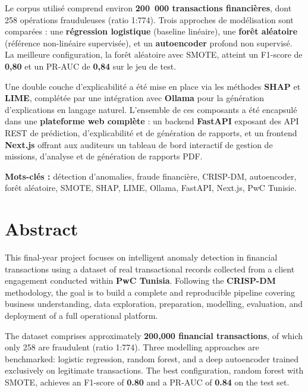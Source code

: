 \documentclass[12pt,a4paper,twoside]{report}
\begin{document}
Le corpus utilisé comprend environ \textbf{200~000 transactions financières}, dont 258 opérations frauduleuses (ratio 1:774). Trois approches de modélisation sont comparées : une \textbf{régression logistique} (baseline linéaire), une \textbf{forêt aléatoire} (référence non-linéaire supervisée), et un \textbf{autoencoder} profond non supervisé. La meilleure configuration, la forêt aléatoire avec SMOTE, atteint un F1-score de \textbf{0,80} et un PR-AUC de \textbf{0,84} sur le jeu de test.

Une double couche d'explicabilité a été mise en place via les méthodes \textbf{SHAP} et \textbf{LIME}, complétée par une intégration avec \textbf{Ollama} pour la génération d'explications en langage naturel. L'ensemble de ces composants a été encapsulé dans une \textbf{plateforme web complète} : un backend \textbf{FastAPI} exposant des API REST de prédiction, d'explicabilité et de génération de rapports, et un frontend \textbf{Next.js} offrant aux auditeurs un tableau de bord interactif de gestion de missions, d'analyse et de génération de rapports PDF.

\vspace{0.5cm}
\textbf{Mots-clés :} détection d'anomalies, fraude financière, CRISP-DM, autoencoder, forêt aléatoire, SMOTE, SHAP, LIME, Ollama, FastAPI, Next.js, PwC Tunisie.

\newpage

\chapter*{Abstract}

This final-year project focuses on intelligent anomaly detection in financial transactions using a dataset of real transactional records collected from a client engagement conducted within \textbf{PwC Tunisia}. Following the \textbf{CRISP-DM} methodology, the goal is to build a complete and reproducible pipeline covering business understanding, data exploration, preparation, modelling, evaluation, and deployment of a full operational platform.

The dataset comprises approximately \textbf{200,000 financial transactions}, of which only 258 are fraudulent (ratio 1:774). Three modelling approaches are benchmarked: logistic regression, random forest, and a deep autoencoder trained exclusively on legitimate transactions. The best configuration, random forest with SMOTE, achieves an F1-score of \textbf{0.80} and a PR-AUC of \textbf{0.84} on the test set.
\end{document}
